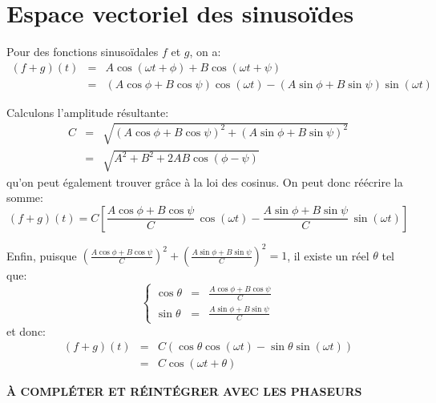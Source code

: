 \section{Espace vectoriel des sinusoïdes}
\label{sec:math/espace-vect-sinus}

Pour des fonctions sinusoïdales $f$ et $g$, on a:
\[
    \begin{array}{rcl}
        (f+g)(t) &=& A\cos(\omega t + \phi) + B\cos(\omega t + \psi) \\
                 &=& (A\cos\phi+B\cos\psi)\cos(\omega t)
                     - (A\sin\phi+B\sin\psi)\sin(\omega t)
    \end{array}
\]

Calculons l'amplitude résultante:
\[
    \begin{array}{rcl}
        C &=& \sqrt{(A\cos\phi+B\cos\psi)^2+(A\sin\phi+B\sin\psi)^2} \\
          &=& \sqrt{A^2+B^2+2AB\cos(\phi-\psi)}
    \end{array}
\]
qu'on peut également trouver grâce à la loi des cosinus.
On peut donc réécrire la somme:
\[
    (f+g)(t) = C\left[ \frac{A\cos\phi+B\cos\psi}{C}\, \cos(\omega t)
                     - \frac{A\sin\phi+B\sin\psi}{C}\, \sin(\omega t) \right]
\]

Enfin, puisque $\left( \frac{A\cos\phi+B\cos\psi}{C} \right)^2
+ \left( \frac{A\sin\phi+B\sin\psi}{C} \right)^2 = 1$,
il existe un réel $\theta$ tel que:
\[
    \left\{
    \begin{array}{rcl}
        \cos\theta &=& \frac{A\cos\phi+B\cos\psi}{C} \\
        \sin\theta &=& \frac{A\sin\phi+B\sin\psi}{C}
    \end{array}
    \right.
\]
et donc:
\[
    \begin{array}{rcl}
        (f+g)(t) &=& C ( \cos\theta\cos(\omega t)
                       - \sin\theta\sin(\omega t) ) \\
                 &=& C\cos(\omega t + \theta)
    \end{array}
\]

\textbf{À COMPLÉTER ET RÉINTÉGRER AVEC LES PHASEURS}
